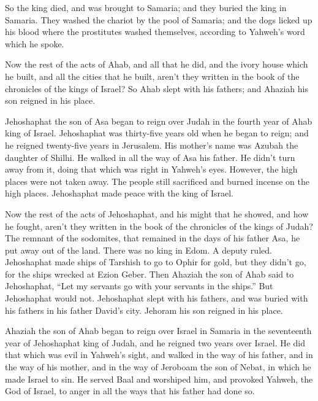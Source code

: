  So the king died, and was brought to Samaria; and they
buried the king in Samaria.  They washed the chariot by the
pool of Samaria; and the dogs licked up his blood where the prostitutes
washed themselves, according to Yahweh's word which he spoke.

 Now the rest of the acts of Ahab, and all that he did, and
the ivory house which he built, and all the cities that he built, aren't
they written in the book of the chronicles of the kings of Israel?
 So Ahab slept with his fathers; and Ahaziah his son
reigned in his place.

 Jehoshaphat the son of Asa began to reign over Judah in
the fourth year of Ahab king of Israel.  Jehoshaphat was
thirty-five years old when he began to reign; and he reigned twenty-five
years in Jerusalem. His mother's name was Azubah the daughter of Shilhi.
 He walked in all the way of Asa his father. He didn't turn
away from it, doing that which was right in Yahweh's eyes. However, the
high places were not taken away. The people still sacrificed and burned
incense on the high places.  Jehoshaphat made peace with
the king of Israel.

 Now the rest of the acts of Jehoshaphat, and his might
that he showed, and how he fought, aren't they written in the book of
the chronicles of the kings of Judah?  The remnant of the
sodomites, that remained in the days of his father Asa, he put away out
of the land.  There was no king in Edom. A deputy ruled.
 Jehoshaphat made ships of Tarshish to go to Ophir for
gold, but they didn't go, for the ships wrecked at Ezion Geber.
 Then Ahaziah the son of Ahab said to Jehoshaphat, ``Let my
servants go with your servants in the ships.'' But Jehoshaphat would
not.  Jehoshaphat slept with his fathers, and was buried
with his fathers in his father David's city. Jehoram his son reigned in
his place.

 Ahaziah the son of Ahab began to reign over Israel in
Samaria in the seventeenth year of Jehoshaphat king of Judah, and he
reigned two years over Israel.  He did that which was evil
in Yahweh's sight, and walked in the way of his father, and in the way
of his mother, and in the way of Jeroboam the son of Nebat, in which he
made Israel to sin.  He served Baal and worshiped him, and
provoked Yahweh, the God of Israel, to anger in all the ways that his
father had done so.

